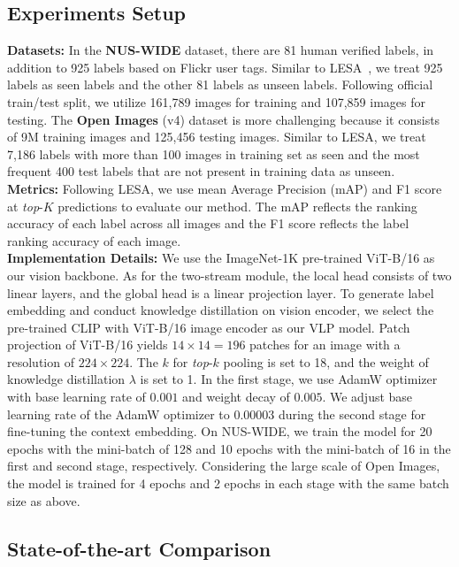 \documentclass[letterpaper]{article} %
\begin{document}
\subsection{Experiments Setup}
\noindent\textbf{Datasets:}
In the \textbf{NUS-WIDE} dataset, there are 81 human verified labels, in addition to 925 labels based on Flickr user tags.
Similar to LESA~\cite{lesa}, we treat 925 labels as seen labels and the other 81 labels as unseen labels.
Following official train/test split, we utilize 161,789 images for training and 107,859 images for testing.
The \textbf{Open Images} (v4) dataset is more challenging because it consists of 9M training images and 125,456 testing images.
Similar to LESA, we treat 7,186 labels with more than 100 images in training set as seen and the most frequent 400 test labels that are not present in training data as unseen. \\
\noindent\textbf{Metrics:}
Following LESA, we use mean Average Precision (mAP) and F1 score at \textit{top}-$K$ predictions to evaluate our method.
The mAP reflects the ranking accuracy of each label across all images and the F1 score reflects the label ranking accuracy of each image. \\
\noindent\textbf{Implementation Details:}
We use the ImageNet-1K pre-trained ViT-B/16 as our vision backbone.
As for the two-stream module, the local head consists of two linear layers, and the global head is a linear projection layer.
To generate label embedding and conduct knowledge distillation on vision encoder, we select the pre-trained CLIP with ViT-B/16 image encoder as our VLP model.
Patch projection of ViT-B/16 yields $14 \times 14=196$ patches for an image with a resolution of $224 \times 224$.
The $k$ for \textit{top}-$k$ pooling is set to 18, and the weight of knowledge distillation $\lambda$ is set to 1.
In the first stage, we use AdamW optimizer with base learning rate of $0.001$ and weight decay of $0.005$.
We adjust base learning rate of the AdamW optimizer to $0.00003$ during the second stage for fine-tuning the context embedding.
On NUS-WIDE, we train the model for 20 epochs with the mini-batch of 128 and 10 epochs with the mini-batch of 16 in the first and second stage, respectively.
Considering the large scale of Open Images, the model is trained for 4 epochs and 2 epochs in each stage with the same batch size as above.

\subsection{State-of-the-art Comparison}
\end{document}
